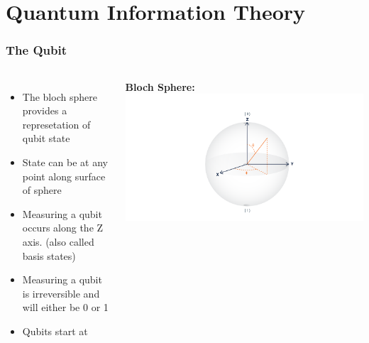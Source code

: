 \documentclass[aspectratio=169,11pt,hyperref={colorlinks=true}]{beamer}
\begin{document}
\section{Quantum Information Theory}
\begin{frame}
    \frametitle{The Qubit}
    \begin{columns}
            \begin{itemize}
                \item The bloch sphere provides a represetation of qubit state
                \item State can be at any point along surface of sphere
                \item Measuring a qubit occurs along the Z axis. (also called basis states)
                \item Measuring a qubit is irreversible and will either be 0
                      or 1
                \item Qubits start at 
            \end{itemize}
            \centering
            \textbf{Bloch Sphere:}
            \includegraphics[width=\textwidth]{bloch_angles.png}
    \end{columns}
\end{frame}
\end{document}
